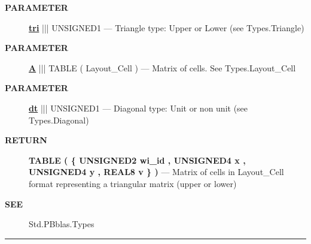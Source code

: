 \par
\begin{description}
\item [\colorbox{tagtype}{\color{white} \textbf{\textsf{PARAMETER}}}] \textbf{\underline{tri}} ||| UNSIGNED1 --- Triangle type: Upper or Lower (see Types.Triangle)
\item [\colorbox{tagtype}{\color{white} \textbf{\textsf{PARAMETER}}}] \textbf{\underline{A}} ||| TABLE ( Layout\_Cell ) --- Matrix of cells. See Types.Layout\_Cell
\item [\colorbox{tagtype}{\color{white} \textbf{\textsf{PARAMETER}}}] \textbf{\underline{dt}} ||| UNSIGNED1 --- Diagonal type: Unit or non unit (see Types.Diagonal)
\end{description}







\par
\begin{description}
\item [\colorbox{tagtype}{\color{white} \textbf{\textsf{RETURN}}}] \textbf{TABLE ( \{ UNSIGNED2 wi\_id , UNSIGNED4 x , UNSIGNED4 y , REAL8 v \} )} --- Matrix of cells in Layout\_Cell format representing a triangular matrix (upper or lower)
\end{description}






\par
\begin{description}
\item [\colorbox{tagtype}{\color{white} \textbf{\textsf{SEE}}}] Std.PBblas.Types
\end{description}




\rule{\linewidth}{0.5pt}
